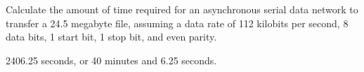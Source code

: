 

Calculate the amount of time required for an asynchronous serial data network to transfer a 24.5 megabyte file, assuming a data rate of 112 kilobits per second, 8 data bits, 1 start bit, 1 stop bit, and even parity.







2406.25 seconds, or 40 minutes and 6.25 seconds.











